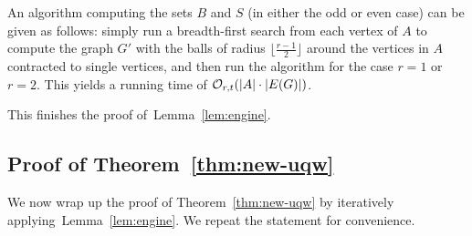  \medskip An algorithm computing the sets $B$ and $S$ (in either the
 odd or even case) can be given as follows: simply run a breadth-first
 search from each vertex of $A$ to compute the graph $G'$ with the
 balls of radius $\lfloor \frac{r-1}2 \rfloor$ around the vertices in
 $A$ contracted to single vertices, and then run the algorithm for the
 case $r=1$ or $r=2$.  This yields a running time of
 $\mathcal{O}_{r,t}(|A|\cdot |E(G)|)$.  \medskip
  
This finishes  the proof of~Lemma~\ref{lem:engine}.

\subsection{Proof of Theorem~\ref{thm:new-uqw}}
We now wrap up the proof of Theorem~\ref{thm:new-uqw} by iteratively
applying~Lemma~\ref{lem:engine}.  We repeat the statement for
convenience.

